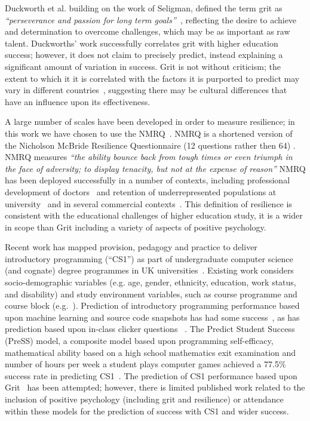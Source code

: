 \documentclass[sigconf]{acmart}
\begin{document}
Duckworth et al. building on the work of Seligman, defined the term grit as {\em``perseverance and passion for long term goals''~\cite[p.~1087]{Duckworth2007}}, reflecting the desire to achieve and determination to overcome challenges, which may be as important as raw talent. Duckworths' work successfully correlates grit with higher education success; however, it does not claim to precisely predict, instead explaining a significant amount of variation in success. Grit is not without criticism; the extent to which it it is correlated with the factors it is purported to predict may vary in different countries~\cite{Datu2016, Tyumeneva2017}, suggesting there may be cultural differences that have an influence upon its effectiveness. 

A large number of scales have been developed in order to measure resilience; in this work we have chosen to use the NMRQ~\cite{Clarke2010}. NMRQ is a shortened version of the Nicholson McBride Resilience Questionnaire (12 questions rather then 64) \cite{Clarke2010}. NMRQ measures {\em``the ability bounce back from tough times or even triumph in the face of adversity; to display tenacity, but not at the expense of reason''\cite[p.~1]{Clarke2010}} NMRQ has been deployed successfully in a number of contexts, including professional development of doctors~\cite{Tregoningg251} and retention of underrepresented populations at university~\cite{Daniels2015} and in several commercial contexts~\cite{Clarke2010}. This definition of resilience is consistent with the educational challenges of higher education study, it is a wider in scope than Grit including a variety of aspects of positive psychology.

Recent work has mapped provision, pedagogy and practice to deliver introductory programming (``CS1'') as part of undergraduate computer science (and cognate) degree programmes in UK universities~\cite{davenport-et-al:latice2016,murphy-et-al:programming2017,simon-et-al:sigcse2018}. Existing work considers socio-demographic variables (e.g. age, gender, ethnicity, education, work status, and disability) and study environment variables, such as course programme and course block (e.g.~\cite{Liao:2019:RML:3308443.3277569}). Prediction of introductory programming performance based upon machine learning and source code snapshots has had some success~\cite{Ahadi:2015:EML:2787622.2787717,Castro-Wunsch:2017:ENN:3017680.3017792}, as has prediction based upon in-class clicker questions ~\cite{Liao:2019:RML:3308443.3277569}. The Predict Student Success (PreSS) model, a composite model based upon programming self-efficacy, mathematical ability based on a high school mathematics exit examination and number of hours per week a student plays computer games achieved a 77.5\% success rate in predicting CS1~\cite{Quille:2018:PPS:3197091.3197101}. The prediction of CS1 performance based upon Grit~\cite{Sigurdson:2018:EGC:3279720.3279743} has been attempted; however, there is limited published work related to the inclusion of positive psychology (including grit and resilience) or attendance within these models for the prediction of success with CS1 and wider success.
\end{document}
